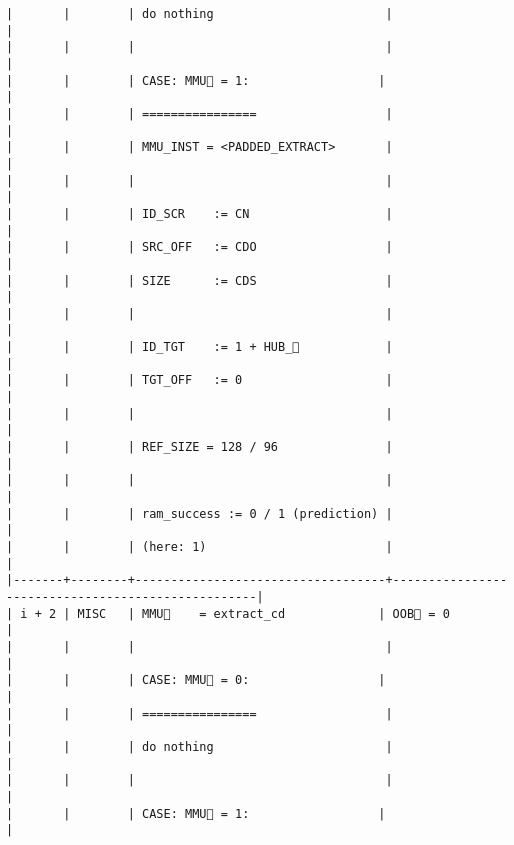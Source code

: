 \documentclass[varwidth=\maxdimen,margin=0.5cm,multi={verbatim}]{standalone}
\begin{document}
\begin{verbatim}
|       |        | do nothing                        |                                                   |
|       |        |                                   |                                                   |
|       |        | CASE: MMU🚩 = 1:                  |                                                   |
|       |        | ================                  |                                                   |
|       |        | MMU_INST = <PADDED_EXTRACT>       |                                                   |
|       |        |                                   |                                                   |
|       |        | ID_SCR    := CN                   |                                                   |
|       |        | SRC_OFF   := CDO                  |                                                   |
|       |        | SIZE      := CDS                  |                                                   |
|       |        |                                   |                                                   |
|       |        | ID_TGT    := 1 + HUB_            |                                                   |
|       |        | TGT_OFF   := 0                    |                                                   |
|       |        |                                   |                                                   |
|       |        | REF_SIZE = 128 / 96               |                                                   |
|       |        |                                   |                                                   |
|       |        | ram_success := 0 / 1 (prediction) |                                                   |
|       |        | (here: 1)                         |                                                   |
|-------+--------+-----------------------------------+---------------------------------------------------|
| i + 2 | MISC   | MMU🚩    = extract_cd             | OOB🚩 = 0                                         |
|       |        |                                   |                                                   |
|       |        | CASE: MMU🚩 = 0:                  |                                                   |
|       |        | ================                  |                                                   |
|       |        | do nothing                        |                                                   |
|       |        |                                   |                                                   |
|       |        | CASE: MMU🚩 = 1:                  |                                                   |

\end{verbatim}
\end{document}
